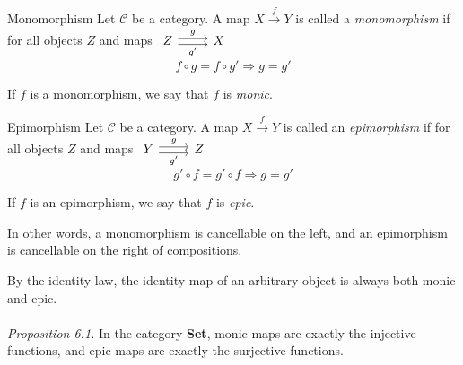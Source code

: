 \begin{definition}{Monomorphism}
  Let $\mathscr{C}$ be a category. A map $X \overset{f}{\to} Y$ is called a \emph{monomorphism} if for all objects $Z$ and maps
  $
  \begin{tikzcd}
    Z \arrow[r,shift left, "g"] \arrow[r,shift right,swap,"g'"] & X
  \end{tikzcd}
  $
  \[
    f \circ g = f \circ g' \Rightarrow g = g'
  \]

  If $f$ is a monomorphism, we say that $f$ is \emph{monic}.

\end{definition}

\begin{definition}{Epimorphism}
  Let $\mathscr{C}$ be a category. A map $X \overset{f}{\to} Y$ is called an \emph{epimorphism} if for all objects $Z$ and maps
  $
  \begin{tikzcd}
    Y \arrow[r,shift left, "g"] \arrow[r,shift right,swap,"g'"] & Z
  \end{tikzcd}
  $
  \[
    g' \circ f = g' \circ f \Rightarrow g = g'
  \]

  If $f$ is an epimorphism, we say that $f$ is \emph{epic}.

\end{definition}


In other words, a monomorphism is cancellable on the left, and an epimorphism is cancellable on the right of compositions.

By the identity law, the identity map of an arbitrary object is always both monic and epic.\\
\\ \textit{Proposition 6.1.} In the category \textbf{Set}, monic maps are exactly the injective functions, and epic maps are exactly the surjective functions.

